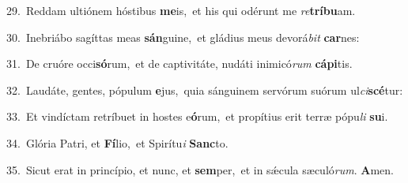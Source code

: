 {\numbfont\textcolor{\numbcolor}{29.}}~Reddam ultiónem hóstibus \textbf{me}\-is,~\star et his qui odérunt me \textit{re}\-\textbf{trí}\textbf{bu}am.\par
{\numbfont\textcolor{\numbcolor}{30.}}~Inebriábo sagíttas meas \textbf{sán}\-guine,~\star et gládius meus devorá\textit{bit} \textbf{car}\-nes:\par
{\numbfont\textcolor{\numbcolor}{31.}}~De cruóre occi\-\textbf{só}\-rum,~\star et de captivitáte, nudáti inimicó\textit{rum} \textbf{cá}\-\textbf{pi}tis.\par
{\numbfont\textcolor{\numbcolor}{32.}}~Laudáte, gentes, pópulum \textbf{e}\-jus,~\star quia sánguinem servórum suórum ul\-\textit{ci}\-\textbf{scé}tur:\par
{\numbfont\textcolor{\numbcolor}{33.}}~Et vindíctam retríbuet in hostes e\-\textbf{ó}\-rum,~\star et propítius erit terræ pópu\textit{li} \textbf{su}\-i.\par
{\numbfont\textcolor{\numbcolor}{34.}}~Glória Patri, et \textbf{Fí}\-lio,~\star et Spirítu\textit{i} \textbf{Sanc}\-to.\par
{\numbfont\textcolor{\numbcolor}{35.}}~Sicut erat in princípio, et nunc, et \textbf{sem}\-per,~\star et in sǽcula sæculó\-\textit{rum}\-. \textbf{A}\-men.\par
